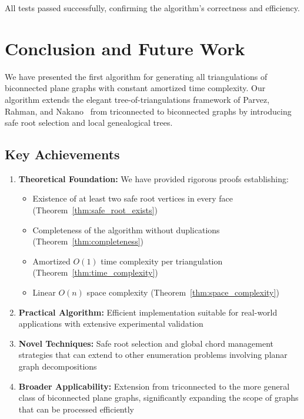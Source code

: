 \documentclass[12pt,a4paper]{article}
\theoremstyle{definition}
\theoremstyle{remark}
\begin{document}
All tests passed successfully, confirming the algorithm's correctness and efficiency.

\section{Conclusion and Future Work}
\label{sec:conclusion}

We have presented the first algorithm for generating all triangulations of biconnected plane graphs with constant amortized time complexity. Our algorithm extends the elegant tree-of-triangulations framework of Parvez, Rahman, and Nakano~\cite{parvez2011} from triconnected to biconnected graphs by introducing safe root selection and local genealogical trees.

\subsection{Key Achievements}

\begin{enumerate}
\item \textbf{Theoretical Foundation:} We have provided rigorous proofs establishing:
    \begin{itemize}
        \item Existence of at least two safe root vertices in every face (Theorem~\ref{thm:safe_root_exists})
        \item Completeness of the algorithm without duplications (Theorem~\ref{thm:completeness})
        \item Amortized $O(1)$ time complexity per triangulation (Theorem~\ref{thm:time_complexity})
        \item Linear $O(n)$ space complexity (Theorem~\ref{thm:space_complexity})
    \end{itemize}

\item \textbf{Practical Algorithm:} Efficient implementation suitable for real-world applications with extensive experimental validation

\item \textbf{Novel Techniques:} Safe root selection and global chord management strategies that can extend to other enumeration problems involving planar graph decompositions

\item \textbf{Broader Applicability:} Extension from triconnected to the more general class of biconnected plane graphs, significantly expanding the scope of graphs that can be processed efficiently
\end{enumerate}
\end{document}

